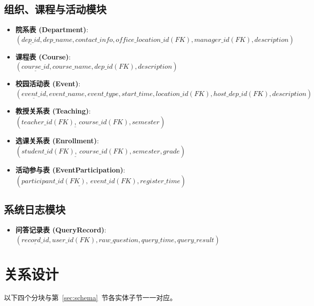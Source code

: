 \documentclass[11pt, a4paper]{article}
\begin{document}
\subsection{组织、课程与活动模块}
\begin{itemize}
    \item \textbf{院系表 (Department)}: 
    \\ $(\underline{dep\_id}, dep\_name, contact\_info, office\_location\_id(FK), manager\_id(FK), description)$
    \item \textbf{课程表 (Course)}: 
    \\ $(\underline{course\_id}, course\_name, dep\_id(FK), description)$
    \item \textbf{校园活动表 (Event)}: 
    \\ $(\underline{event\_id}, event\_name, event\_type, start\_time, location\_id(FK), host\_dep\_id(FK), description)$
    \item \textbf{教授关系表 (Teaching)}: 
    \\ $(\underline{teacher\_id(FK),\ course\_id(FK)}, semester)$
    \item \textbf{选课关系表 (Enrollment)}: 
    \\ $(\underline{student\_id(FK),\ course\_id(FK)}, semester, grade)$
    \item \textbf{活动参与表 (EventParticipation)}: 
    \\ $(\underline{participant\_id(FK),\ event\_id(FK)}, register\_time)$
\end{itemize}

\subsection{系统日志模块}
\begin{itemize}
    \item \textbf{问答记录表 (QueryRecord)}: 
    \\ $(\underline{record\_id}, user\_id(FK), raw\_question, query\_time, query\_result)$
\end{itemize}

\section{关系设计}

以下四个分块与第~\ref{sec:schema}~节各实体子节一一对应。
\end{document}
